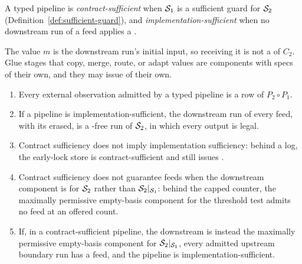 \begin{definition}
\label{def:sufficient-pipeline}
A typed pipeline is \emph{contract-sufficient} when $\mathcal{S}_1$ is a sufficient
guard for $\mathcal{S}_2$ (Definition~\ref{def:sufficient-guard}), and
\emph{implementation-sufficient} when no downstream run of a feed applies a
\commitment.
\end{definition}

The value $m$ is the downstream run's initial input, so receiving it is not
a \commitment of $C_2$.  Glue stages that copy, merge, route, or adapt values
are components with specs of their own, and they may issue \commitments of
their own.

\begin{proposition}
\label{prop:typed-pipelines}
\leavevmode
\begin{enumerate}
\item Every external observation admitted by a typed pipeline is a row of
      $P_2\circ P_1$.
\item If a pipeline is implementation-sufficient, the downstream run of every
      feed, with its \commitments erased, is a \commitment-free run of
      $\mathcal{S}_2$, in which every output is legal.
\item Contract sufficiency does not imply implementation sufficiency: behind a
      log, the early-lock store is contract-sufficient and still issues
      \commitments.
\item Contract sufficiency does not guarantee feeds when the downstream
      component is for $\mathcal{S}_2$ rather than $\mathcal{S}_2|_{\mathcal{S}_1}$: behind the
      capped counter, the maximally permissive empty-basis component for the
      threshold test admits no feed at an offered count.
\item If, in a contract-sufficient pipeline, the downstream is instead the
      maximally permissive empty-basis component for $\mathcal{S}_2|_{\mathcal{S}_1}$,
      every admitted upstream boundary run has a feed, and the pipeline is
      implementation-sufficient.
\end{enumerate}
\end{proposition}

